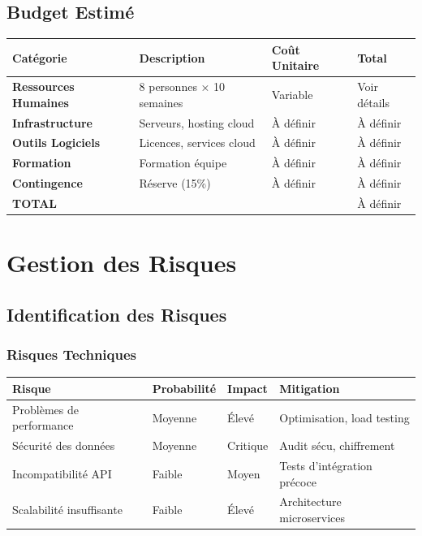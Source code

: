 \documentclass[12pt,a4paper,french]{report}
\begin{document}
\section{Budget Estimé}

\begin{table}[H]
\centering
\begin{tabularx}{\textwidth}{|l|X|l|l|}
\hline
\rowcolor{LightGray}
\textbf{Catégorie} & \textbf{Description} & \textbf{Coût Unitaire} & \textbf{Total} \\
\hline
\textbf{Ressources Humaines} & 8 personnes × 10 semaines & Variable & Voir détails \\
\hline
\textbf{Infrastructure} & Serveurs, hosting cloud & À définir & À définir \\
\hline
\textbf{Outils Logiciels} & Licences, services cloud & À définir & À définir \\
\hline
\textbf{Formation} & Formation équipe & À définir & À définir \\
\hline
\textbf{Contingence} & Réserve (15\%) & À définir & À définir \\
\hline
\textbf{TOTAL} & & & À définir \\
\hline
\end{tabularx}
\end{table}

\chapter{Gestion des Risques}

\section{Identification des Risques}

\subsection{Risques Techniques}

\begin{table}[H]
\centering
\begin{tabularx}{\textwidth}{|l|l|l|l|}
\hline
\rowcolor{LightGray}
\textbf{Risque} & \textbf{Probabilité} & \textbf{Impact} & \textbf{Mitigation} \\
\hline
Problèmes de performance & Moyenne & Élevé & Optimisation, load testing \\
\hline
Sécurité des données & Moyenne & Critique & Audit sécu, chiffrement \\
\hline
Incompatibilité API & Faible & Moyen & Tests d'intégration précoce \\
\hline
Scalabilité insuffisante & Faible & Élevé & Architecture microservices \\
\hline
\end{tabularx}
\end{table}
\end{document}
